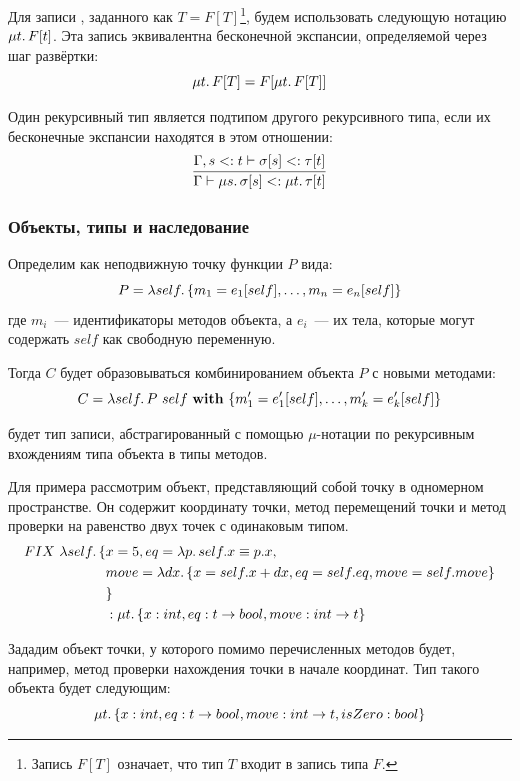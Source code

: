 Для записи , заданного как $T = F[T]$\footnote{Запись $F[T]$ означает, что тип $T$ входит в запись типа $F$.}, будем использовать следующую нотацию $\mu t\ldotp F[t]$.
Эта запись эквивалентна бесконечной экспансии, определяемой через шаг развёртки:
\[\mu t\ldotp F[T] = F[\mu t\ldotp F[T]]\]

Один рекурсивный тип является подтипом другого рекурсивного типа, если их бесконечные экспансии находятся в этом отношении:
\begin{equation}
    \label{eq:recursive-subtyping}
    \infer{
        \Gamma \vdash \mu s\ldotp \sigma[s] <: \mu t\ldotp \tau[t]
    }{
        \Gamma, s <: t \vdash \sigma[s] <: \tau[t]
    }
\end{equation}

\subsubsection{Объекты, типы и наследование}

Определим  как неподвижную точку функции $P$ вида:
\[
    P = \lambda self \ldotp \{m_1 = e_1[self], \ldots, m_n = e_n[self]\}
\]
где $m_i$~--- идентификаторы методов объекта, а $e_i$~--- их тела, которые могут содержать $self$ как свободную переменную.

Тогда  $C$ будет образовываться комбинированием объекта $P$ с новыми методами:
\[
    C = \lambda self \ldotp P~self~\mathbf{with}~\{m_1' = e_1'[self], \ldots, m_k' = e_k'[self]\}
\]

 будет тип записи, абстрагированный с помощью $\mu$-нотации по рекурсивным вхождениям типа объекта в типы методов.

Для примера рассмотрим объект, представляющий собой точку в одномерном пространстве.
Он содержит координату точки, метод перемещений точки и метод проверки на равенство двух точек с одинаковым типом.
\begin{align*}
    FIX~ \lambda self \ldotp \{ &x = 5, eq = \lambda p \ldotp self.x \equiv p.x,
    \\
    &move = \lambda dx \ldotp \{ x = self.x + dx, eq = self.eq, move = self.move \}
    \\
    &\}
    \\
    &:
    \mu t \ldotp \{ x : int, eq : t \to bool, move : int \to t \}
\end{align*}

Зададим объект точки, у которого помимо перечисленных методов будет, например, метод проверки нахождения точки в начале координат.
Тип такого объекта будет следующим:
\[
    \mu t \ldotp \{ x : int, eq : t \to bool, move : int \to t, isZero : bool \}
\]

